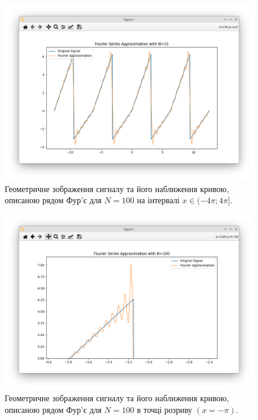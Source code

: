\documentclass[oneside,14pt]{extarticle}
\begin{document}
\begin{normalsize}
	\begin{figure}[H]
		\centering
		\vspace{-30pt}
		\includegraphics[scale=0.58]{1}
		\vspace{-30pt}
		\caption{Геометричне зображення сигналу та його наближення кривою, описаною рядом Фур’є для $N=100$ на інтервалі $x\in(-4\pi;4\pi]$.}
	\end{figure}
	
	\begin{figure}[H]
		\centering
		\vspace{-30pt}
		\includegraphics[scale=0.58]{2}
		\vspace{-30pt}
		\caption{Геометричне зображення сигналу та його наближення кривою, описаною рядом Фур’є для $N=100$ в точці розриву $(x=-\pi)$.}
	\end{figure}
	

\end{normalsize}
\end{document}

